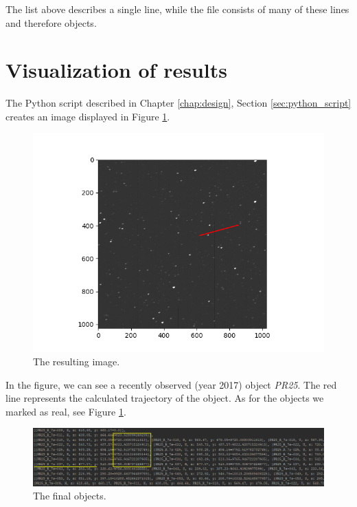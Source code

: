 	The list above describes a single line, while the file consists of many of these lines and therefore objects.
	
	\newpage

\section{Visualization of results}\label{sec:visualization}

	The Python script described in Chapter \ref{chap:design}, Section \ref{sec:python_script} creates an image displayed in Figure \ref{fig:result}.
	
	\begin{figure}[H]
	\centering
	  \includegraphics[width=\linewidth]{images/fig}
		  \caption{The resulting image.}
	  \label{fig:result}
	\end{figure}
	
	In the figure, we can see a recently observed (year 2017) object \emph{PR25}. The red line represents the calculated trajectory of the object. As for the objects we marked as real, see Figure \ref{fig:result}.
	
	\begin{figure}[H]
	\centering
	  \includegraphics[width=\linewidth]{images/results_list}
		  \caption{The final objects.}
	  \label{fig:result_list}
	\end{figure}
	
